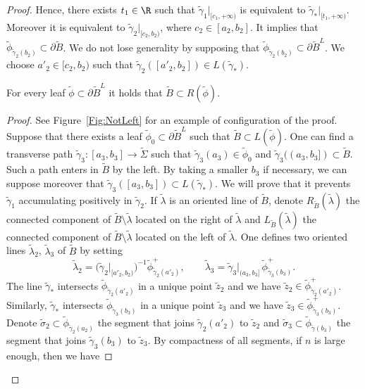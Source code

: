 \begin{proof}
Hence, there exists $t_1\in\R$ such that $\tilde\gamma_1|_{[c_1,+\infty)}$ is equivalent to $\tilde\gamma_*\vert_{[t_1,+\infty)}$. Moreover it is equivalent to $\tilde\gamma_2\vert_{[c_2,b_2)}$, where $c_2\in[a_2,b_2]$. It implies that $\tilde\phi_{\tilde\gamma_2(b_2)}\subset\partial\tilde B$. We do not lose generality by supposing that $\tilde\phi_{\tilde\gamma_2(b_2)}\subset\partial\tilde B^L$. We choose $a'_2\in[c_2,b_2)$ such that $\tilde\gamma_2([a'_2,b_2])\in L(\tilde\gamma_*)$.

\begin{lemm}\label{lem:NotLeft}
For every leaf $\tilde\phi\subset\partial\tilde B^L$ it holds that $\tilde B\subset R(\tilde \phi)$.
\end{lemm}

\begin{proof}
See Figure~\ref{Fig:NotLeft} for an example of configuration of the proof. Suppose that there exists a leaf $\tilde\phi_0\subset\partial\tilde B^L$ such that $\tilde B\subset L(\tilde \phi)$. One can find a transverse path $\tilde \gamma_3:[a_3,b_3]\to\tilde\Sigma$ such that $\tilde\gamma_3(a_3)\in\tilde\phi_0$ and $\tilde\gamma_3((a_3,b_3])\subset \tilde B$. Such a path enters in $\tilde B$ by the left. By taking a smaller $b_3$ if necessary, we can suppose moreover that $\tilde\gamma_3([a_3,b_3])\subset L(\tilde \gamma_*)$. We will prove that it prevents $\tilde\gamma_1$ accumulating positively in $\tilde\gamma_2$. If $\tilde \lambda$ is an oriented line of $\tilde B$, denote $R_{\tilde B}(\tilde\lambda)$ the connected component of $\tilde B\setminus\tilde\lambda$ located on the right of $\tilde\lambda$ and $L_{\tilde B}(\tilde\lambda)$ the connected component of $\tilde B\setminus\tilde\lambda$ located on the left of $\tilde\lambda$. One defines two oriented lines $\tilde\lambda_2$, $\tilde\lambda_3$ of $\tilde B$ by setting
\begin{equation}\label{Eq:NotLeft1}
\tilde\lambda_2=\big(\tilde\gamma_2\vert_{[a'_2,b_2)}\big)^{-1} \tilde\phi^+_{\tilde\gamma_2(a'_2)}, \qquad \tilde\lambda_3=\tilde\gamma_3\vert_{(a_3,b_3]}\, \tilde\phi^+_{\tilde \gamma_3(b_3)}.
\end{equation}
The line $\tilde\gamma_*$ intersects $\tilde\phi_{\tilde\gamma_2(a'_2)}$ in a unique point $\tilde z_2$ and we have $\tilde z_2\in\tilde\phi^+_{\tilde\gamma_2(a'_2)}$. Similarly, $\tilde\gamma_*$ intersects $\tilde\phi_{\tilde\gamma_3(b_3)}$ in a unique point $\tilde z_3$ and we have $\tilde z_3\in\tilde\phi^+_{\tilde\gamma_3(b_3)}$. Denote $\tilde\sigma_2\subset\tilde\phi_{\tilde\gamma_2(a_2)}$ the segment that joins $\tilde\gamma_2(a'_2)$ to $\tilde z_2$ and $\tilde\sigma_3\subset\tilde\phi_{\tilde\gamma(b_3)}$ the segment that joins $\tilde\gamma_3(b_3)$ to $\tilde z_3$. By compactness of all segments, if $n$ is large enough, then we have

\end{proof}
\end{proof}
